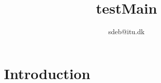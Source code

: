\documentclass[10pt,a4paper]{article}
\author{sdeb@itu.dk}
\title{testMain}
\begin{document}
\tableofcontents
\newpage
\part{Introduction}



\end{document}
